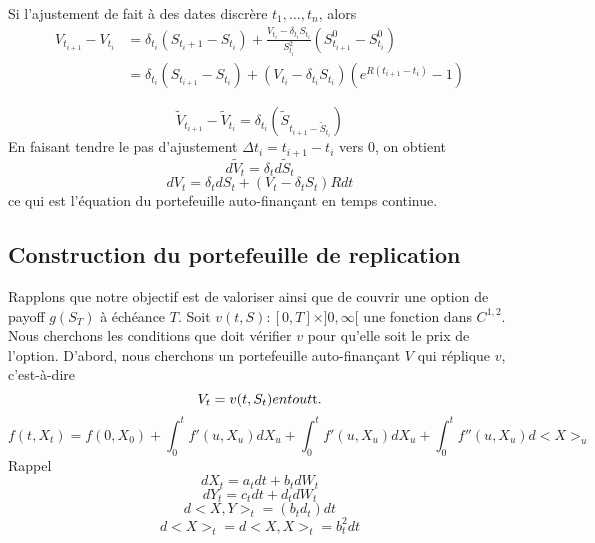 \documentclass{article}
\begin{document}
Si l'ajustement de fait \`a des dates discr\`ere $t_1,\ldots,t_n$,  alors
\begin{equation}
\begin{split}
V_{t_{i+1}}-V_{t_i}&=\delta_{t_i}(S_{t_i+1}-S_{t_i})+\frac{V_{t_i}-\delta_{t_i}S_{t_i}}{S^2_{t_i}}(S^0_{t_{i+1}}-S^0_{t_{i}})\\
&=\delta_{t_i}(S_{t_{i+1}}-S_{t_i})+(V_{t_i}-\delta_{t_i}S_{t_i})(e^{R(t_{i+1}-t_i)}-1)
\end{split}
\end{equation}

\begin{equation}
\tilde{V}_{t_{i+1}}-\tilde{V}_{t_i}=\delta_{t_i}(\tilde{S}_{t_{i+1}-\tilde{S}_{t_i}})
\end{equation}
En faisant tendre le pas d'ajustement $\Delta t_i=t_{i+1}-t_i$ vers $0$, on obtient
\begin{equation}
d\tilde{V}_t=\delta_td\tilde{S}_t
\end{equation}
\begin{equation}
dV_t=\delta_tdS_t+(V_t-\delta_t S_t)Rdt
\end{equation}
ce qui est l'\'equation du portefeuille auto-finan\c{c}ant en temps continue. 

\subsection{Construction du portefeuille de replication}

Rapplons que notre objectif est de valoriser ainsi que de couvrir une option de payoff $g(S_T)$ \`a \'ech\'eance $T$.
Soit $v(t,S):[0,T]\times]0,\infty[ $ une fonction dans $C^{1,2}$.
Nous cherchons les conditions que doit v\'erifier $v$ pour qu'elle soit le prix de l'option.
D'abord, nous cherchons un portefeuille auto-finan\c{c}ant $V$ qui r\'eplique $v$, c'est-\`a-dire
\begin{equation}
V_t=v(t,S_t)  en tout $t$.
\end{equation}
\begin{equation}
f(t,X_t)=f(0,X_0)+\int_0^tf'(u,X_u)dX_u+\int_0^t f'(u,X_u)dX_u+\int_0^tf''(u,X_u)d<X>_u
\end{equation}
Rappel
\begin{equation}
dX_t=a_tdt+b_tdW_t
\end{equation}
\begin{equation}
dY_t=c_tdt+d_tdW_t
\end{equation}
\begin{equation}
d<X,Y>_t=(b_td_t)dt
\end{equation}
\begin{equation}
d<X>_t=d<X,X>_t=b_t^2dt
\end{equation}
\end{document}
